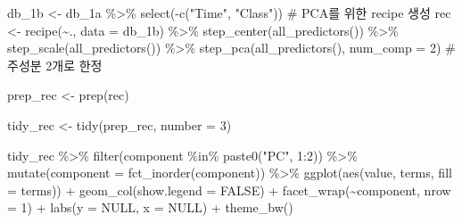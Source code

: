 \documentclass[
  letterpaper,
  DIV=11,
  numbers=noendperiod]{scrreprt}
\newenvironment{Shaded}{\begin{snugshade}}{\end{snugshade}}
\newcommand{\AttributeTok}[1]{\textcolor[rgb]{0.40,0.45,0.13}{#1}}
\newcommand{\CommentTok}[1]{\textcolor[rgb]{0.37,0.37,0.37}{#1}}
\newcommand{\ConstantTok}[1]{\textcolor[rgb]{0.56,0.35,0.01}{#1}}
\newcommand{\DecValTok}[1]{\textcolor[rgb]{0.68,0.00,0.00}{#1}}
\newcommand{\FunctionTok}[1]{\textcolor[rgb]{0.28,0.35,0.67}{#1}}
\newcommand{\NormalTok}[1]{\textcolor[rgb]{0.00,0.23,0.31}{#1}}
\newcommand{\OtherTok}[1]{\textcolor[rgb]{0.00,0.23,0.31}{#1}}
\newcommand{\SpecialCharTok}[1]{\textcolor[rgb]{0.37,0.37,0.37}{#1}}
\newcommand{\StringTok}[1]{\textcolor[rgb]{0.13,0.47,0.30}{#1}}
\begin{document}
\begin{Shaded}
\begin{Highlighting}[]
\NormalTok{db\_1b }\OtherTok{\textless{}{-}}\NormalTok{ db\_1a }\SpecialCharTok{\%\textgreater{}\%} \FunctionTok{select}\NormalTok{(}\SpecialCharTok{{-}}\FunctionTok{c}\NormalTok{(}\StringTok{"Time"}\NormalTok{, }\StringTok{"Class"}\NormalTok{))}
\CommentTok{\# PCA를 위한 recipe 생성}
\NormalTok{rec }\OtherTok{\textless{}{-}} \FunctionTok{recipe}\NormalTok{(}\SpecialCharTok{\textasciitilde{}}\NormalTok{., }\AttributeTok{data =}\NormalTok{ db\_1b) }\SpecialCharTok{\%\textgreater{}\%}
  \FunctionTok{step\_center}\NormalTok{(}\FunctionTok{all\_predictors}\NormalTok{()) }\SpecialCharTok{\%\textgreater{}\%}
  \FunctionTok{step\_scale}\NormalTok{(}\FunctionTok{all\_predictors}\NormalTok{()) }\SpecialCharTok{\%\textgreater{}\%}
  \FunctionTok{step\_pca}\NormalTok{(}\FunctionTok{all\_predictors}\NormalTok{(), }\AttributeTok{num\_comp =} \DecValTok{2}\NormalTok{) }\CommentTok{\# 주성분 2개로 한정}

\NormalTok{prep\_rec }\OtherTok{\textless{}{-}} \FunctionTok{prep}\NormalTok{(rec)}

\NormalTok{tidy\_rec }\OtherTok{\textless{}{-}} \FunctionTok{tidy}\NormalTok{(prep\_rec, }\AttributeTok{number =} \DecValTok{3}\NormalTok{)}

\NormalTok{tidy\_rec }\SpecialCharTok{\%\textgreater{}\%}
  \FunctionTok{filter}\NormalTok{(component }\SpecialCharTok{\%in\%} \FunctionTok{paste0}\NormalTok{(}\StringTok{"PC"}\NormalTok{, }\DecValTok{1}\SpecialCharTok{:}\DecValTok{2}\NormalTok{)) }\SpecialCharTok{\%\textgreater{}\%}
  \FunctionTok{mutate}\NormalTok{(}\AttributeTok{component =} \FunctionTok{fct\_inorder}\NormalTok{(component)) }\SpecialCharTok{\%\textgreater{}\%}
  \FunctionTok{ggplot}\NormalTok{(}\FunctionTok{aes}\NormalTok{(value, terms, }\AttributeTok{fill =}\NormalTok{ terms)) }\SpecialCharTok{+}
  \FunctionTok{geom\_col}\NormalTok{(}\AttributeTok{show.legend =} \ConstantTok{FALSE}\NormalTok{) }\SpecialCharTok{+}
  \FunctionTok{facet\_wrap}\NormalTok{(}\SpecialCharTok{\textasciitilde{}}\NormalTok{component, }\AttributeTok{nrow =} \DecValTok{1}\NormalTok{) }\SpecialCharTok{+}
  \FunctionTok{labs}\NormalTok{(}\AttributeTok{y =} \ConstantTok{NULL}\NormalTok{, }\AttributeTok{x =} \ConstantTok{NULL}\NormalTok{) }\SpecialCharTok{+}
  \FunctionTok{theme\_bw}\NormalTok{()}
\end{Highlighting}
\end{Shaded}
\end{document}
